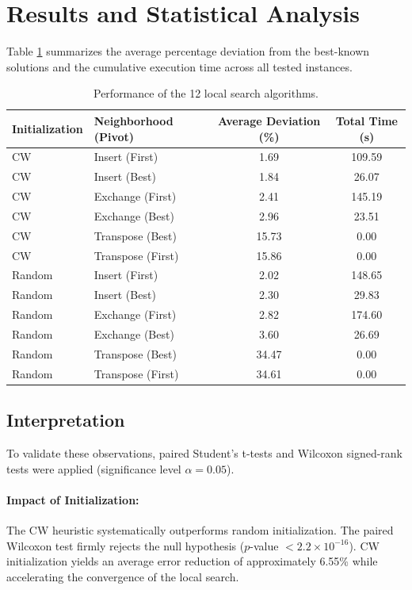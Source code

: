 \documentclass[11pt, a4paper]{article}
\begin{document}
\section{Results and Statistical Analysis}

Table \ref{tab:results} summarizes the average percentage deviation from the best-known solutions and the cumulative execution time across all tested instances.

\begin{table}[h]
\centering
\begin{tabular}{llcc}
\toprule
\textbf{Initialization} & \textbf{Neighborhood (Pivot)} & \textbf{Average Deviation (\%)} & \textbf{Total Time (s)} \\
\midrule
CW & Insert (First) & 1.69 & 109.59 \\
CW & Insert (Best) & 1.84 & 26.07 \\
CW & Exchange (First) & 2.41 & 145.19 \\
CW & Exchange (Best) & 2.96 & 23.51 \\
CW & Transpose (Best) & 15.73 & 0.00 \\
CW & Transpose (First) & 15.86 & 0.00 \\
\midrule
Random & Insert (First) & 2.02 & 148.65 \\
Random & Insert (Best) & 2.30 & 29.83 \\
Random & Exchange (First) & 2.82 & 174.60 \\
Random & Exchange (Best) & 3.60 & 26.69 \\
Random & Transpose (Best) & 34.47 & 0.00 \\
Random & Transpose (First) & 34.61 & 0.00 \\
\bottomrule
\end{tabular}
\caption{Performance of the 12 local search algorithms.}
\label{tab:results}
\end{table}

\subsection{Interpretation}
To validate these observations, paired Student's t-tests and Wilcoxon signed-rank tests were applied (significance level $\alpha = 0.05$).

\paragraph{Impact of Initialization:} 
The CW heuristic systematically outperforms random initialization. The paired Wilcoxon test firmly rejects the null hypothesis ($p$-value $< 2.2 \times 10^{-16}$). CW initialization yields an average error reduction of approximately 6.55\% while accelerating the convergence of the local search.
\end{document}
